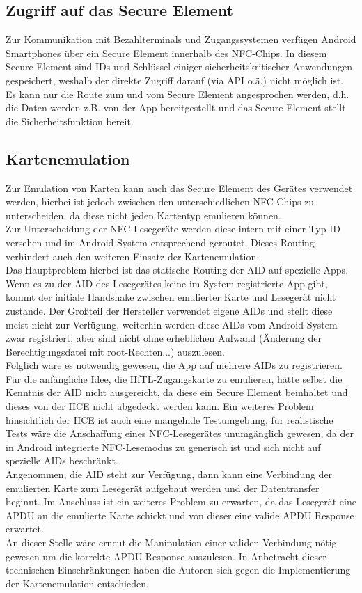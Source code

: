 \documentclass[a4paper,ngerman,12pt]{report}
\begin{document}
\subsection*{Zugriff auf das Secure Element}

Zur Kommunikation mit Bezahlterminals und Zugangssystemen verfügen Android Smartphones über ein Secure Element innerhalb des NFC-Chips. In diesem Secure Element sind IDs und Schlüssel einiger sicherheitskritischer Anwendungen gespeichert, weshalb der direkte Zugriff darauf (via API o.ä.) nicht möglich ist. \\
Es kann nur die Route zum und vom Secure Element angesprochen werden, d.h. die Daten werden z.B. von der App bereitgestellt und das Secure Element stellt die Sicherheitsfunktion bereit.

\subsection*{Kartenemulation}

Zur Emulation von Karten kann auch das Secure Element des Gerätes verwendet werden, hierbei ist jedoch zwischen den unterschiedlichen NFC-Chips zu unterscheiden, da diese nicht jeden Kartentyp emulieren können.\\
Zur Unterscheidung der NFC-Lesegeräte werden diese intern mit einer Typ-ID versehen und im Android-System entsprechend geroutet. Dieses Routing verhindert auch den weiteren Einsatz der Kartenemulation.\\ Das Hauptproblem hierbei ist das statische Routing der \ac{AID} auf spezielle Apps. 
Wenn es zu der AID des Lesegerätes keine im System registrierte App gibt,  kommt der initiale Handshake zwischen emulierter Karte und Lesegerät nicht zustande. 
Der Großteil der Hersteller verwendet eigene AIDs und stellt diese meist nicht zur Verfügung, weiterhin werden diese AIDs vom Android-System zwar registriert, aber sind nicht ohne erheblichen Aufwand (Änderung der Berechtigungsdatei mit root-Rechten...) auszulesen. \\
Folglich wäre es notwendig gewesen, die App auf mehrere AIDs zu registrieren. Für die anfängliche Idee, die HfTL-Zugangskarte zu emulieren, hätte selbst die Kenntnis der AID nicht ausgereicht, da diese ein Secure Element beinhaltet und dieses von der \ac{HCE} nicht abgedeckt werden kann. \newpage
Ein weiteres Problem hinsichtlich der \ac{HCE} ist auch eine mangelnde Testumgebung, für realistische Tests wäre die Anschaffung eines NFC-Lesegerätes unumgänglich gewesen, da der in Android integrierte NFC-Lesemodus zu generisch ist und sich nicht auf spezielle AIDs beschränkt. \\
Angenommen, die AID steht zur Verfügung, dann kann eine Verbindung der emulierten Karte zum Lesegerät aufgebaut werden und der Datentransfer beginnt. 
Im Anschluss ist ein weiteres Problem zu erwarten, da das Lesegerät eine \ac{APDU} an die emulierte Karte schickt und von dieser eine valide APDU Response erwartet. \\
An dieser Stelle wäre erneut die Manipulation einer validen Verbindung nötig gewesen um die korrekte APDU Response auszulesen. In Anbetracht dieser technischen Einschränkungen haben die Autoren sich gegen die Implementierung der Kartenemulation entschieden.
\end{document}
